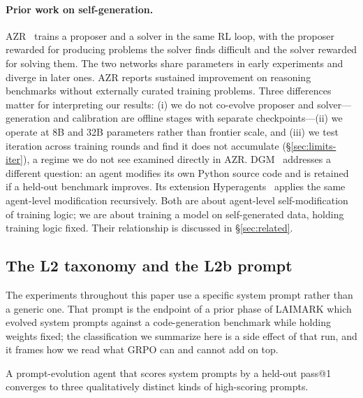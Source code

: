 \documentclass[11pt,a4paper]{article}
\begin{document}
\paragraph{Prior work on self-generation.}
AZR~\citep{zhao2025azr} trains a proposer and a solver in the same RL loop, with the proposer rewarded for producing problems the solver finds difficult and the solver rewarded for solving them.
The two networks share parameters in early experiments and diverge in later ones.
AZR reports sustained improvement on reasoning benchmarks without externally curated training problems.
Three differences matter for interpreting our results: (i) we do not co-evolve proposer and solver---generation and calibration are offline stages with separate checkpoints---(ii) we operate at 8B and 32B parameters rather than frontier scale, and (iii) we test iteration across training rounds and find it does not accumulate (\S\ref{sec:limits-iter}), a regime we do not see examined directly in AZR.
DGM~\citep{zhang2025dgm} addresses a different question: an agent modifies its own Python source code and is retained if a held-out benchmark improves.
Its extension Hyperagents~\citep{zhang2026hyperagents} applies the same agent-level modification recursively.
Both are about agent-level self-modification of training logic; we are about training a model on self-generated data, holding training logic fixed.
Their relationship is discussed in \S\ref{sec:related}.

\subsection{The L2 taxonomy and the L2b prompt}
\label{sec:background-l2}

The experiments throughout this paper use a specific system prompt rather than a generic one.
That prompt is the endpoint of a prior phase of LAIMARK which evolved system prompts against a code-generation benchmark while holding weights fixed; the classification we summarize here is a side effect of that run, and it frames how we read what GRPO can and cannot add on top.

A prompt-evolution agent that scores system prompts by a held-out pass@1 converges to three qualitatively distinct kinds of high-scoring prompts.
\end{document}
